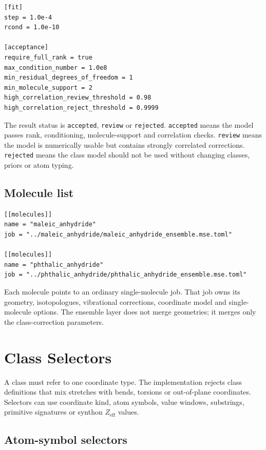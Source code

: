\documentclass[11pt]{article}
\newcommand{\zeff}{Z_\mathrm{eff}}
\begin{document}
\begin{lstlisting}[style=oracle]
[fit]
step = 1.0e-4
rcond = 1.0e-10

[acceptance]
require_full_rank = true
max_condition_number = 1.0e8
min_residual_degrees_of_freedom = 1
min_molecule_support = 2
high_correlation_review_threshold = 0.98
high_correlation_reject_threshold = 0.9999
\end{lstlisting}

\noindent
The result status is \texttt{accepted}, \texttt{review} or \texttt{rejected}.
\texttt{accepted} means the model passes rank, conditioning, molecule-support
and correlation checks.  \texttt{review} means the model is numerically usable
but contains strongly correlated corrections.  \texttt{rejected} means the
class model should not be used without changing classes, priors or atom typing.

\subsection{Molecule list}

\begin{lstlisting}[style=oracle]
[[molecules]]
name = "maleic_anhydride"
job = "../maleic_anhydride/maleic_anhydride_ensemble.mse.toml"

[[molecules]]
name = "phthalic_anhydride"
job = "../phthalic_anhydride/phthalic_anhydride_ensemble.mse.toml"
\end{lstlisting}

\noindent
Each molecule points to an ordinary single-molecule job.  That job owns its
geometry, isotopologues, vibrational corrections, coordinate model and
single-molecule options.  The ensemble layer does not merge geometries; it
merges only the class-correction parameters.

\section{Class Selectors}

A class must refer to one coordinate type.  The implementation rejects class
definitions that mix stretches with bends, torsions or out-of-plane
coordinates.  Selectors can use coordinate kind, atom symbols, value windows,
substrings, primitive signatures or synthon \(\zeff\) values.

\subsection{Atom-symbol selectors}
\end{document}
